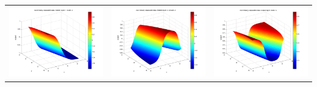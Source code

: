 \documentclass[fleqn]{article}
\begin{document}
\begin{center}
\begin{longtable}{ c | c | r }
    \includegraphics[scale=0.25]{./pics/nonlinearlyseparable/_4_2/_4_2_epoch_10_hidden layer 1 :3} & \includegraphics[scale=0.25]{./pics/nonlinearlyseparable/_4_2/_4_2_epoch_10_hidden layer 2 :22} & \includegraphics[scale=0.25]{./pics/nonlinearlyseparable/_4_2/_4_2_epoch_10_output layer :3}\\

\end{longtable}
\end{center}
\end{document}
